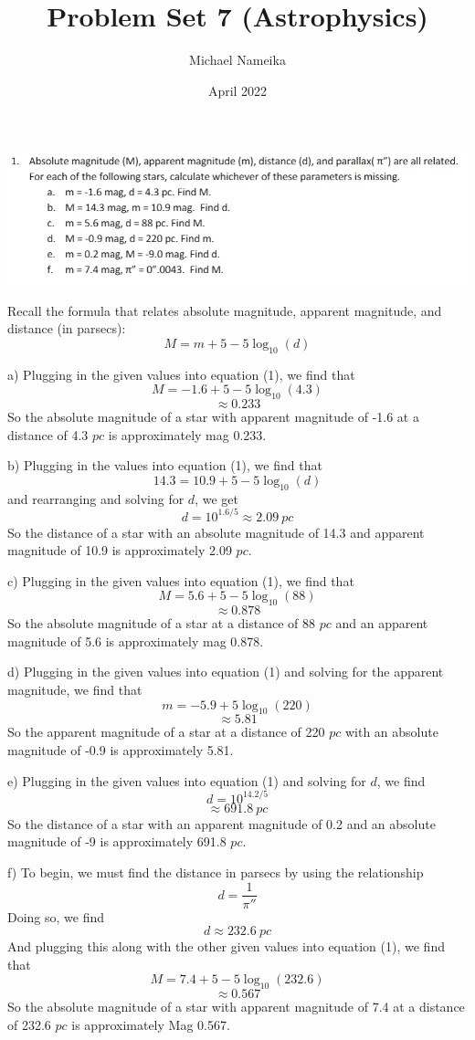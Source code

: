 \documentclass{article}
\title{Problem Set 7 (Astrophysics)}
\author{Michael Nameika}
\date{April 2022}
\begin{document}
\maketitle

\includegraphics[scale = 0.8]{probset7prob1.PNG}

Recall the formula that relates absolute magnitude, apparent magnitude, and distance (in parsecs):
\begin{equation}
    M = m + 5 - 5\log_{10}{(d)}
\end{equation}

a) Plugging in the given values into equation (1), we find that
\[M = -1.6 + 5 - 5\log_{10}{(4.3)}\]
\[ \approx 0.233\]
So the absolute magnitude of a star with apparent magnitude of -1.6 at a distance of 4.3 $pc$ is approximately mag 0.233.

b) Plugging in the values into equation (1), we find that 
\[14.3 = 10.9 + 5 - 5\log_{10}{(d)}\]
and rearranging and solving for $d$, we get
\[d = 10^{1.6/5} \approx 2.09 \: pc\]
So the distance of a star with an absolute magnitude of 14.3 and apparent magnitude of 10.9 is approximately 2.09 $pc$.

c) Plugging in the given values into equation (1), we find that
\[M = 5.6 + 5 - 5\log_{10}{(88)}\]
\[ \approx 0.878\]
So the absolute magnitude of a star at a distance of 88 $pc$ and an apparent magnitude of 5.6 is approximately mag 0.878.

d) Plugging in the given values into equation (1) and solving for the apparent magnitude, we find that
\[m = -5.9 + 5\log_{10}{(220)}\]
\[\approx 5.81\]
So the apparent magnitude of a star at a distance of 220 $pc$ with an absolute magnitude of -0.9 is approximately 5.81.

e) Plugging in the given values into equation (1) and solving for $d$, we find
\[d = 10^{14.2/5}\]
\[\approx 691.8 \:pc\]
So the distance of a star with an apparent magnitude of 0.2 and an absolute magnitude of -9 is approximately 691.8 $pc$.

f) To begin, we must find the distance in parsecs by using the relationship
\[d = \frac{1}{\pi''}\]
Doing so, we find
\[d \approx 232.6 \:pc\]
And plugging this along with the other given values into equation (1), we find that 
\[M = 7.4 + 5 - 5\log_{10}{(232.6)}\]
\[\approx 0.567\]
So the absolute magnitude of a star with apparent magnitude of 7.4 at a distance of 232.6 $pc$ is approximately Mag 0.567.
\newline
\end{document}
